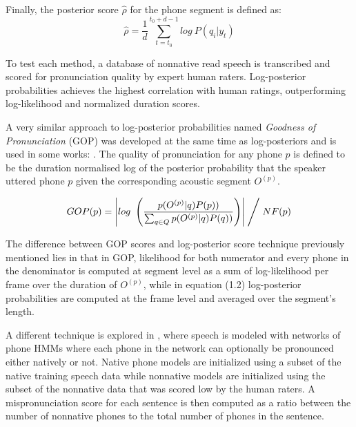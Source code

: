 Finally, the posterior score $\hat{\rho}$ for the phone segment is defined as:
\begin{equation}
\hat{\rho} = \frac{1}{d}\sum_{t=t_{0}}^{t_{0}+d-1} log \ P(q_{i}|y_{t})
\end{equation}

To test each method, a database of nonnative read speech is transcribed and scored for 
pronunciation quality by expert human raters. Log-posterior probabilities achieves the
highest correlation with human ratings, outperforming log-likelihood and normalized duration
scores.

A very similar approach to log-posterior probabilities named \textit{Goodness of Pronunciation}
(GOP) was developed at the same time as log-posteriors and
is used in some works: \cite{gop_1} \cite{gop_2} \cite{gop_3}. The quality of 
pronunciation for any phone $p$ is defined to be the duration normalised log of the posterior
probability that the speaker uttered phone $p$ given the corresponding acoustic segment
$O^{(p)}$.

\begin{equation}
GOP(p) = \left| log \ \left(\frac{p(O^{(p)}|q)P(p))}{\sum_{q \in Q}p(O^{(p)}|q)P(q))}\right) \right| \Biggm/ NF(p)
\end{equation}

The difference between GOP scores and log-posterior score technique previously mentioned 
lies in that in GOP, likelihood for both numerator and every phone in the denominator is
computed at segment level as a sum of log-likelihood per frame over the 
duration of $O^{(p)}$, while in equation (1.2) log-posterior probabilities are computed
at the frame level and averaged over the segment's length.

A different technique is explored in \cite{detection_mispronunciation_instruction}, where
speech is modeled with networks of phone HMMs where each phone in the network can optionally
be pronounced either natively or not. Native phone models are initialized using a subset of
the native training speech data while nonnative models are initialized using the subset of 
the nonnative data that was scored low by the human raters. A mispronunciation score for each
sentence is then computed as a ratio between the number of nonnative phones to the total 
number of phones in the sentence.

